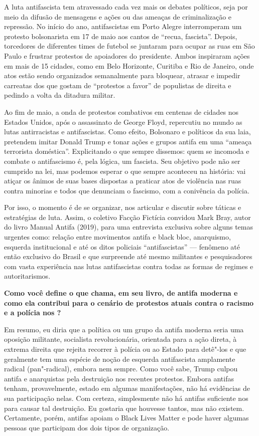 \bigskip

A luta antifascista tem atravessado cada vez mais os debates políticos, seja por meio da difusão de mensagens e ações ou das ameaças de criminalização e repressão. No início do ano, antifascistas em Porto Alegre interromperam um protesto bolsonarista em 17 de maio aos cantos de ``recua, fascista''. Depois, torcedores de diferentes times de futebol se juntaram para ocupar as ruas em São Paulo e frustrar protestos de apoiadores do presidente. Ambos inspiraram ações em mais de 15 cidades, como em Belo Horizonte, Curitiba e Rio de Janeiro, onde atos estão sendo organizados semanalmente para bloquear, atrasar e impedir carreatas dos que gostam de ``protestos a favor'' de populistas de direita e pedindo a volta da ditadura militar.
 
Ao fim de maio, a onda de protestos combativos em centenas de cidades nos Estados Unidos, após o assassinato de George Floyd, repercutiu no mundo as lutas antirracistas e antifascistas. Como efeito, Bolsonaro e políticos da sua laia, pretendem imitar Donald Trump e tonar ações e grupos antifa em uma ``ameaça terrorista doméstica''. Explicitando o que sempre dissemos: quem se incomoda e combate o antifascismo é, pela lógica, um fascista. Seu objetivo pode não ser cumprido na lei, mas podemos esperar o que sempre aconteceu na história: vai atiçar os ânimos de suas bases dispostas a praticar atos de violência nas ruas contra minorias e todos que denunciam o fascismo, com a conivência da polícia.
 
Por isso, o momento é de se organizar, nos articular e discutir sobre táticas e estratégias de luta. Assim, o coletivo Facção Fictícia convidou Mark Bray, autor do livro Manual Antifa (2019), para uma entrevista exclusiva sobre alguns temas urgentes como: relação entre movimentos antifa e black bloc, anarquismo, esquerda institucional e até os ditos policiais ``antifascistas'' --- fenômeno até então exclusivo do Brasil e que surpreende até mesmo militantes e pesquisadores com vasta experiência nas lutas antifascistas contra todas as formas de regimes e autoritarismos.


\textbf{Como você define o que chama, em seu livro, de antifa moderna e como ela contribui para o cenário de protestos atuais contra o racismo e a polícia nos ?}

Em resumo, eu diria que a política ou um grupo da antifa moderna seria uma oposição militante, socialista revolucionária, orientada para a ação direta, à extrema direita que rejeita recorrer à polícia ou ao Estado para detê"-los e que geralmente tem uma espécie de noção de esquerda antifascista amplamente radical (pan"-radical), embora nem sempre. Como você sabe, Trump culpou antifa e anarquistas pela destruição nos recentes protestos. Embora antifas tenham, provavelmente, estado em algumas manifestações, não há evidências de sua participação nelas. Com certeza, simplesmente não há antifas suficiente nos  para causar tal destruição. Eu gostaria que houvesse tantos, mas não existem. Certamente, porém, antifas apoiam o Black Lives Matter e pode haver algumas pessoas que participam dos dois tipos de organização. 
 
